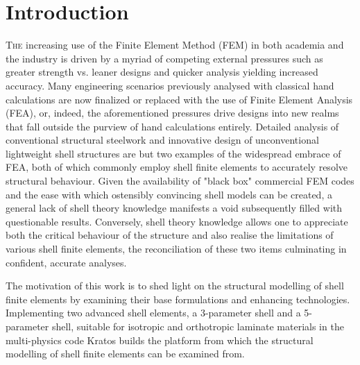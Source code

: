 


\chapter{Introduction}
\label{chap:chapter_1}

\renewcommand{\Thema}{Introduction}

\lettrine[lines=2]{T}{he} increasing use of the Finite Element Method (FEM) in both academia and the industry is driven by a myriad of competing external pressures such as greater strength vs. leaner designs and quicker analysis yielding increased accuracy. Many engineering scenarios previously analysed with classical hand calculations are now finalized or replaced with the use of Finite Element Analysis (FEA), or, indeed, the aforementioned pressures drive designs into new realms that fall outside the purview of hand calculations entirely. Detailed analysis of conventional structural steelwork and innovative design of unconventional lightweight shell structures are but two examples of the widespread embrace of FEA, both of which commonly employ shell finite elements to accurately resolve structural behaviour. Given the availability of "black box" commercial FEM codes and the ease with which ostensibly convincing shell models can be created, a general lack of shell theory knowledge manifests a void subsequently filled with questionable results. Conversely, shell theory knowledge allows one to appreciate both the critical behaviour of the structure and also realise the limitations of various shell finite elements, the reconciliation of these two items culminating in confident, accurate analyses.

The motivation of this work is to shed light on the structural modelling of shell finite elements by examining their base formulations and enhancing technologies. Implementing two advanced shell elements, a 3-parameter shell and a 5-parameter shell, suitable for isotropic and orthotropic laminate materials in the multi-physics code Kratos builds the platform from which the structural modelling of shell finite elements can be examined from. 

